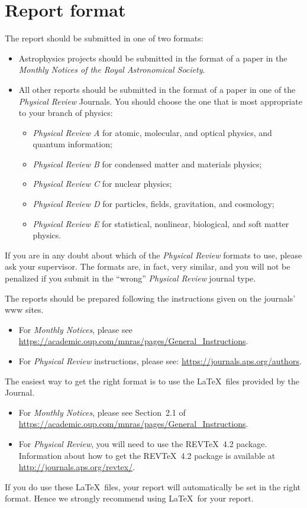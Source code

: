\documentclass[a4paper,fleqn,usenatbib]{mnras}
\begin{document}
\section{Report format}
\label{sec:format}

The report should be submitted in one of two formats:
\begin{itemize}
\item Astrophysics projects should be submitted in the format of a paper in the \textit{Monthly Notices of the Royal Astronomical Society}.
\item All other reports should be submitted in the format of a paper in one of the \textit{Physical Review} Journals. You should choose the one that is most appropriate to your branch of physics:
\begin{itemize}
\item \textit{Physical Review A} for atomic, molecular, and optical physics, and quantum information;
\item \textit{Physical Review B} for condensed matter and materials physics;
\item \textit{Physical Review C} for nuclear physics;
\item \textit{Physical Review D} for particles, fields, gravitation, and cosmology;
\item \textit{Physical Review E} for statistical, nonlinear, biological, and soft matter physics.
\end{itemize}
\end{itemize}
If you are in any doubt about which of the \textit{Physical Review} formats to use, please ask your supervisor. The formats are, in fact, very similar, and you will not be penalized if you submit in the ``wrong''  \textit{Physical Review}  journal type.


The reports should be prepared following the instructions given on the journals' www sites.
\begin{itemize}
\item For \textit{Monthly Notices}, please see \url{https://academic.oup.com/mnras/pages/General_Instructions}.
\item For \textit{Physical Review} instructions, please see: \url{https://journals.aps.org/authors}.
\end{itemize}
The easiest way to get the right format is to use the \LaTeX\  files provided by the Journal.
\begin{itemize}
\item For \textit{Monthly Notices}, please see Section~2.1 of \url{https://academic.oup.com/mnras/pages/General_Instructions}. 
\item For \textit{Physical Review}, you  will need to use the REV\TeX~4.2 package. Information about how to get the REV\TeX~4.2 package is available at \url{http://journals.aps.org/revtex/}.
\end{itemize}
 If you do use these \LaTeX\ files, your report will automatically be set in the right format. Hence we strongly recommend using \LaTeX\ for your report.
 
\end{document}
